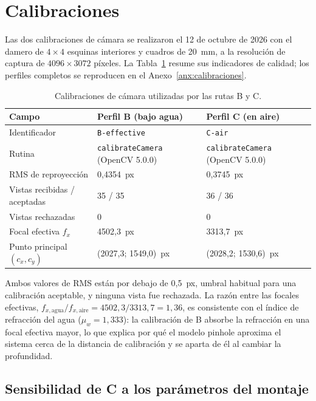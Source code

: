 \documentclass{report}
\begin{document}
\section{Calibraciones}
\label{sec:calibraciones}

Las dos calibraciones de cámara se realizaron el 12 de octubre de 2026 con el damero de $4 \times 4$ esquinas interiores y cuadros de 20~mm, a la resolución de captura de $4096 \times 3072$ píxeles. La Tabla~\ref{tab:calibraciones} resume sus indicadores de calidad; los perfiles completos se reproducen en el Anexo~\ref{anx:calibraciones}.

\begin{table}[htbp]

\caption{Calibraciones de cámara utilizadas por las rutas B y C.}
\label{tab:calibraciones}
\begin{tabular}{@{}p{4.2cm}p{4.4cm}p{4.4cm}@{}}
\hline
Campo & Perfil B (bajo agua) & Perfil C (en aire) \\
\hline
Identificador & \texttt{B-effective} & \texttt{C-air} \\
Rutina & \texttt{calibrateCamera} (OpenCV 5.0.0) & \texttt{calibrateCamera} (OpenCV 5.0.0) \\
RMS de reproyección & 0,4354~px & 0,3745~px \\
Vistas recibidas / aceptadas & 35 / 35 & 36 / 36 \\
Vistas rechazadas & 0 & 0 \\
Focal efectiva $f_x$ & 4502,3~px & 3313,7~px \\
Punto principal $(c_x, c_y)$ & (2027,3; 1549,0)~px & (2028,2; 1530,6)~px \\
\hline
\end{tabular}
\end{table}

Ambos valores de RMS están por debajo de 0,5~px, umbral habitual para una calibración aceptable, y ninguna vista fue rechazada. La razón entre las focales efectivas, $f_{x,\mathrm{agua}}/f_{x,\mathrm{aire}} = 4502{,}3/3313{,}7 = 1{,}36$, es consistente con el índice de refracción del agua ($\mu_w = 1{,}333$): la calibración de B absorbe la refracción en una focal efectiva mayor, lo que explica por qué el modelo pinhole aproxima el sistema cerca de la distancia de calibración y se aparta de él al cambiar la profundidad.

\subsection{Sensibilidad de C a los parámetros del montaje}
\label{sec:sensibilidad}
\end{document}
